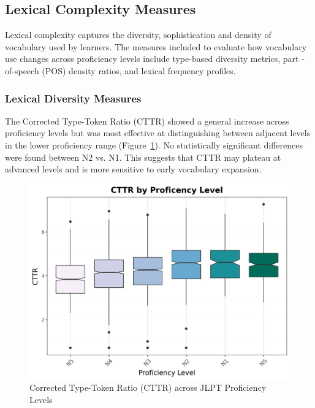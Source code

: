 \subsection{Lexical Complexity Measures}
Lexical complexity captures the diversity, sophistication and density of vocabulary used by learners. The measures
included to evaluate how vocabulary use changes across proficiency levels include type-based diversity metrics, part
-of-speech (POS) density ratios, and lexical frequency profiles.

\subsubsection{Lexical Diversity Measures}

The Corrected Type-Token Ratio (CTTR) showed a general increase across proficiency levels but was most effective at
distinguishing between adjacent levels in the lower proficiency range (Figure~\ref{fig:cttr}). No statistically significant
differences were
found between N2 vs. N1. This suggests that CTTR may plateau at advanced levels and is more sensitive to early
vocabulary expansion.

\begin{figure}[h]
    \centering
    \includegraphics[scale=.5]{img/CTTR}
    \caption[Corrected-Type-Token Ratio (CTTR) across JLPT Proficiency Levels]{Corrected Type-Token Ratio (CTTR) across JLPT Proficiency Levels}
    \label{fig:cttr}
\end{figure}

